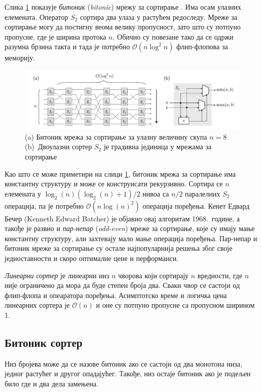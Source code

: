 \documentclass[12pt, a4paper]{article}
\theoremstyle{definition}
\begin{document}
Слика \ref{fig:bitonicStages} показује \textit{битоник} (\textit{bitonic}) мрежу за сортирање \cite{bitonicBatcher}. Има осам улазних елемената. Оператор $S_2$ сортира два улаза у растућем редоследу. Мреже за сортирање могу да постигну веома велику пропусност, зато што су потпуно пропусне, где је ширина протока $n$. Обично су повезане тако да се одржи разумна брзина такта и тада је потребно $\mathcal{O}(n \log^2 n)$ флип-флопова за меморију.
\begin{figure}[H]
  \centering
      \includegraphics[scale=0.24]{slike/bitonicStages.png}
  \caption{(a) Битоник мрежа за сортирање за улазну величину скупа $n = 8$ \mbox{(b) Двоулазни} сортер $S_2$ је градивна јединица у мрежама за сортирање}
  \label{fig:bitonicStages}
\end{figure}
Као што се може приметири на слици \ref{fig:bitonicStages}, битоник мрежа за сортирање има константну структуру и може се конструисати рекурзивно. Сортира се $n$ елемената у $\log_{2}(n)(\log_{2}(n)+1)/2$ нивоа са $n/2$ паралелних $S_2$ операција, па је потребно $\mathcal{O}(n\log(n)^2)$ операција поређења. Кенет Едвард Бечер (Kenneth Edward Batcher) је објавио овај алгоритам 1968.\ године, а такође је развио и \textit{пар-непар} (\textit{odd-even}) мреже за сортирање, које су имају мање константну структуру, али захтевају мало мање операција поређења.
Пар-непар и битоник мреже за сортирање су остале најпопуларнија решења због своје једноставности и скоро оптималне цене и перформанси.

\textit{Линеарни сортер} је линеарни низ $n$ чворова који сортирају $n$ вредности, где $n$ није ограничено да мора да буде степен броја два. Сваки чвор се састоји од флип-флопа и опеаратора поређења. Асимптотско време и логичка цена линеарних сортера је $\mathcal{O}(n)$ и оне су потпуно пропусне са пропусном ширином 1.

\subsection{Битоник сортер}
Низ бројева може да се назове битоник ако се састоји од два монотона низа, једног растућег и другог опадајућег. Такође, низ остаје битоник ако је подељен било где и два дела замењена.
\end{document}
